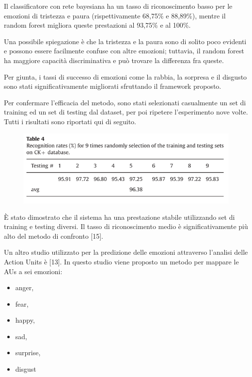 Il classificatore con rete bayesiana ha un tasso di riconoscimento basso per le emozioni di tristezza e paura (rispettivamente 68,75\% e 88,89\%), mentre il random forest migliora queste prestazioni al 93,75\% e al 100\%.

Una possibile spiegazione è che la tristezza e la paura sono di solito poco evidenti e possono essere facilmente confuse con altre emozioni; tuttavia, il random forest ha maggiore capacità discriminativa e può trovare la differenza fra queste. 

Per giunta, i tassi di successo di emozioni come la rabbia, la sorpresa e il disgusto sono stati significativamente migliorati sfruttando il framework proposto. 

Per confermare l'efficacia del metodo, sono stati selezionati casualmente un set di training ed un set di testing dal dataset, per poi ripetere l'esperimento nove volte. Tutti i risultati sono riportati qui di seguito. 
\begin{figure}
    \begin{center}    
        \includegraphics[width=1\linewidth]{images/17.png}
    \end{center}
\end{figure}

È stato dimostrato che il sistema ha una prestazione stabile utilizzando set di training e testing diversi. 
Il tasso di riconoscimento medio è significativamente più alto del metodo di confronto [15].

Un altro studio utilizzato per la predizione delle emozioni attraverso l’analisi delle Action Units è [13].
In questo studio viene proposto un metodo per mappare le AUs a sei emozioni:
\begin{itemize}
    \item anger,
    \item fear,
    \item happy,
    \item sad,
    \item surprise,
    \item disgust
\end{itemize}

